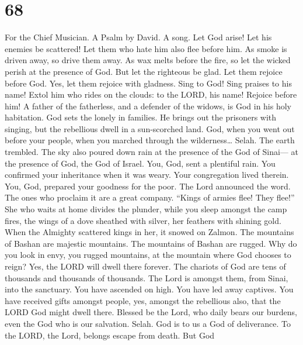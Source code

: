 \hypertarget{section-67}{%
\section{68}\label{section-67}}

For the Chief Musician. A Psalm by David. A song.  Let God
arise! Let his enemies be scattered! Let them who hate him also flee
before him.  As smoke is driven away, so drive them away. As
wax melts before the fire, so let the wicked perish at the presence of
God.  But let the righteous be glad. Let them rejoice before
God. Yes, let them rejoice with gladness.  Sing to God! Sing
praises to his name! Extol him who rides on the clouds: to the LORD, his
name! Rejoice before him!  A father of the fatherless, and a
defender of the widows, is God in his holy habitation.  God
sets the lonely in families. He brings out the prisoners with singing,
but the rebellious dwell in a sun-scorched land.  God, when
you went out before your people, when you marched through the
wilderness\ldots{} Selah.  The earth trembled. The sky also
poured down rain at the presence of the God of Sinai--- at the presence
of God, the God of Israel.  You, God, sent a plentiful rain.
You confirmed your inheritance when it was weary.  Your
congregation lived therein. You, God, prepared your goodness for the
poor.  The Lord announced the word. The ones who proclaim
it are a great company.  ``Kings of armies flee! They
flee!'' She who waits at home divides the plunder,  while
you sleep amongst the camp fires, the wings of a dove sheathed with
silver, her feathers with shining gold.  When the Almighty
scattered kings in her, it snowed on Zalmon.  The mountains
of Bashan are majestic mountains. The mountains of Bashan are rugged.
 Why do you look in envy, you rugged mountains, at the
mountain where God chooses to reign? Yes, the LORD will dwell there
forever.  The chariots of God are tens of thousands and
thousands of thousands. The Lord is amongst them, from Sinai, into the
sanctuary.  You have ascended on high. You have led away
captives. You have received gifts amongst people, yes, amongst the
rebellious also, that the LORD God might dwell there. 
Blessed be the Lord, who daily bears our burdens, even the God who is
our salvation. Selah.  God is to us a God of deliverance.
To the LORD, the Lord, belongs escape from death.  But God
